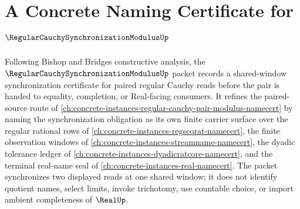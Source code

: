 \chapter{A Concrete Naming Certificate for $\RegularCauchySynchronizationModulusUp$}
\label{ch:concrete-instances-regular-cauchy-synchronization-modulus-namecert}

Following Bishop and Bridges constructive analysis, the $\RegularCauchySynchronizationModulusUp$ packet records a shared-window synchronization certificate for paired regular Cauchy reads before the pair is handed to equality, completion, or Real-facing consumers. It refines the paired-source route of \autoref{ch:concrete-instances-regular-cauchy-pair-modulus-namecert} by naming the synchronization obligation as its own finite carrier surface over the regular rational rows of \autoref{ch:concrete-instances-regseqrat-namecert}, the finite observation windows of \autoref{ch:concrete-instances-streamname-namecert}, the dyadic tolerance ledger of \autoref{ch:concrete-instances-dyadicratcore-namecert}, and the terminal real-name seal of \autoref{ch:concrete-instances-real-namecert}. The packet synchronizes two displayed reads at one shared window; it does not identify quotient names, select limits, invoke trichotomy, use countable choice, or import ambient completeness of $\RealUp$.

